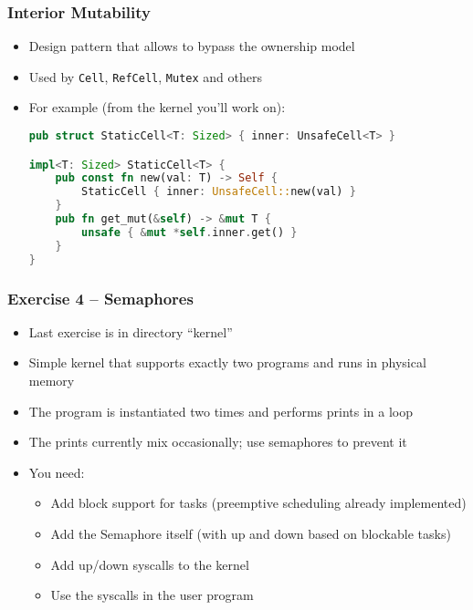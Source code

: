 \begin{frame}[fragile]
    \frametitle{Interior Mutability}

    \begin{itemize}
        \item Design pattern that allows to bypass the ownership model
        \item Used by \texttt{Cell}, \texttt{RefCell}, \texttt{Mutex} and others

        \pause

        \item For example (from the kernel you'll work on):
        \begin{lstlisting}[language=rust]
pub struct StaticCell<T: Sized> { inner: UnsafeCell<T> }

impl<T: Sized> StaticCell<T> {
    pub const fn new(val: T) -> Self {
        StaticCell { inner: UnsafeCell::new(val) }
    }
    pub fn get_mut(&self) -> &mut T {
        unsafe { &mut *self.inner.get() }
    }
}
        \end{lstlisting}
    \end{itemize}
\end{frame}

\begin{frame}[fragile]
    \frametitle{Exercise 4 -- Semaphores}

    \begin{itemize}
        \item Last exercise is in directory ``kernel''
        \item Simple kernel that supports exactly two programs and runs in physical memory
        \item The program is instantiated two times and performs prints in a loop
        \item The prints currently mix occasionally; use semaphores to prevent it
        \item You need:
        \begin{itemize}
            \item Add block support for tasks (preemptive scheduling already implemented)
            \item Add the Semaphore itself (with up and down based on blockable tasks)
            \item Add up/down syscalls to the kernel
            \item Use the syscalls in the user program
        \end{itemize}
    \end{itemize}
\end{frame}
